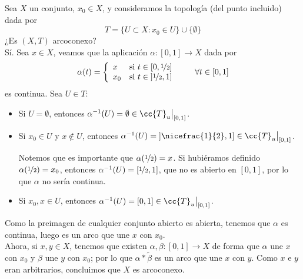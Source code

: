 \begin{ejercicio}
    Sea $X$ un conjunto, $x_0\in X$, y consideramos la topología (del punto incluido) dada por
    \begin{equation*}
        T = \{U\subset X : x_0 \in U\} \cup \{\emptyset \}
    \end{equation*}
    ¿Es $(X,T)$ arcoconexo?\\

    \noindent
    Sí. Sea $x\in X$, veamos que la aplicación $\alpha:[0,1]\to X$ dada por
    \begin{equation*}
        \alpha(t) = \left\{\begin{array}{ll}
                x & \text{si } t\in [0,\nicefrac{1}{2}] \\
                x_0 & \text{si } t\in \left]\nicefrac{1}{2},1\right]
        \end{array}\right. \qquad \forall t\in [0,1]
    \end{equation*}
    es continua. Sea $U\in T$:
    \begin{itemize}
        \item Si $U = \emptyset $, entonces $\alpha^{-1}(U) = \emptyset \in \cc{T}_u\big|_{[0,1]}$.
        \item Si $x_0\in U$ y $x\notin U$, entonces $\alpha^{-1}(U) = \left]\nicefrac{1}{2},1\right]\in \cc{T}_u\big|_{[0,1]}$.
        
        Notemos que es importante que $\alpha(\nicefrac{1}{2}) = x$. Si hubiéramos definido $\alpha(\nicefrac{1}{2}) = x_0$, entonces $\alpha^{-1}(U) = \left[\nicefrac{1}{2},1\right]$, que no es abierto en $[0,1]$, por lo que $\alpha$ no sería continua.
        \item Si $x_0,x\in U$, entonces $\alpha^{-1}(U) = [0,1] \in \cc{T}_u\big|_{[0,1]}$.
    \end{itemize}
    Como la preimagen de cualquier conjunto abierto es abierta, tenemos que $\alpha$ es continua, luego es un arco que une $x$ con $x_0$.\\

    \noindent
    Ahora, si $x,y\in X$, tenemos que existen $\alpha,\beta:[0,1]\to X$ de forma que $\alpha$ une $x$ con $x_0$ y $\beta$ une $y$ con $x_0$; por lo que $\alpha\ast\tilde{\beta}$ es un arco que une $x$ con $y$. Como $x$ e $y$ eran arbitrarios, concluimos que $X$ es arcoconexo.
\end{ejercicio}

